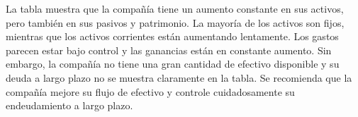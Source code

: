 La tabla muestra que la compañía tiene un aumento constante en sus activos, pero también en sus pasivos y patrimonio. La mayoría de los activos son fijos, mientras que los activos corrientes están aumentando lentamente. Los gastos parecen estar bajo control y las ganancias están en constante aumento. Sin embargo, la compañía no tiene una gran cantidad de efectivo disponible y su deuda a largo plazo no se muestra claramente en la tabla. Se recomienda que la compañía mejore su flujo de efectivo y controle cuidadosamente su endeudamiento a largo plazo.